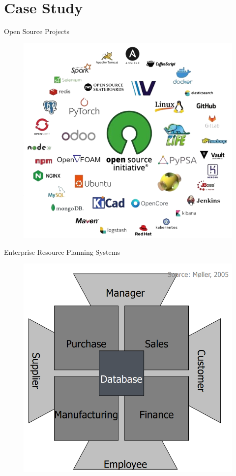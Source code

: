 \section{Case Study}

\begin{frame}{Open Source Projects}
    
\begin{figure}
    \centering
    \includegraphics[width=0.42\linewidth]{assets/signal-2024-03-12-131914_002.png}
\end{figure}

\end{frame}

\begin{frame}{Enterprise Resource Planning Systems}
    
\begin{figure}
    \centering
    \includegraphics[width=0.40\linewidth]{assets/ERP.png}
\end{figure}

\end{frame}


